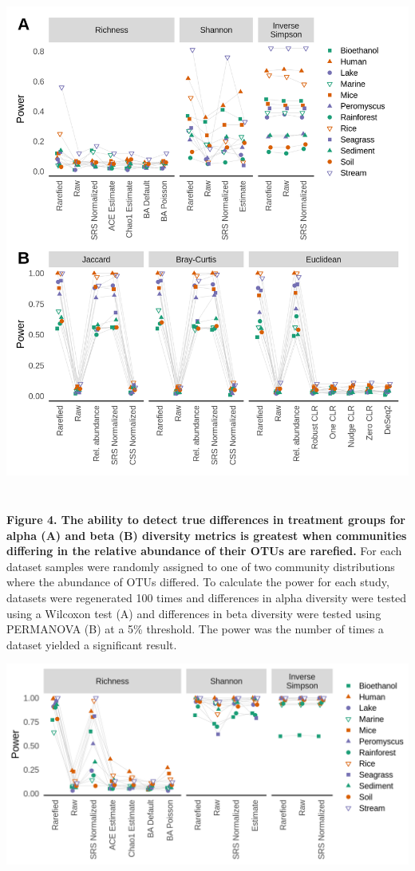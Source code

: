 \documentclass[
]{article}
\begin{document}
\includegraphics[height=17cm]{figure_4.png}

\textbf{Figure 4. The ability to detect true differences in treatment
groups for alpha (A) and beta (B) diversity metrics is greatest when
communities differing in the relative abundance of their OTUs are
rarefied.} For each dataset samples were randomly assigned to one of two
community distributions where the abundance of OTUs differed. To
calculate the power for each study, datasets were regenerated 100 times
and differences in alpha diversity were tested using a Wilcoxon test (A)
and differences in beta diversity were tested using PERMANOVA (B) at a
5\% threshold. The power was the number of times a dataset yielded a
significant result.

\newpage

\includegraphics{figure_5.png}
\end{document}
